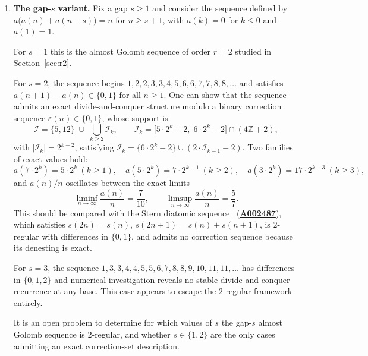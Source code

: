 \documentclass[12pt]{article}
\theoremstyle{definition}
\theoremstyle{remark}
\newcommand{\Z}{\mathbb{Z}}
\newcommand{\oeis}[1]{\href{https://oeis.org/#1}{\textbf{#1}}}
\begin{document}
\begin{enumerate}
  \item \textbf{The gap-$s$ variant.}
        Fix a gap $s\ge 1$ and consider the sequence defined by
        $a\bigl(a(n)+a(n-s)\bigr)=n$ for $n\ge s+1$, with $a(k)=0$ for $k\le 0$
        and $a(1)=1$.

        For $s=1$ this is the almost Golomb sequence of order $r=2$ studied in
        Section~\ref{sec:r2}.

        For $s=2$, the sequence begins
        $1,2,2,3,3,4,5,6,6,7,7,8,8,\ldots$
        and satisfies $a(n+1)-a(n)\in\{0,1\}$ for all $n\ge 1$.
        One can show that the sequence admits an exact divide-and-conquer
        structure modulo a binary correction sequence $\varepsilon(n)\in\{0,1\}$,
        whose support is
        \[
          \mathcal{I} = \{5,12\}\;\cup\;\bigcup_{k\ge 2}\mathcal{I}_k,
          \qquad
          \mathcal{I}_k = \bigl[5\cdot 2^k+2,\;6\cdot 2^k-2\bigr]\cap(4\Z+2),
        \]
        with $|\mathcal{I}_k|=2^{k-2}$, satisfying $\mathcal{I}_k=\{6\cdot 2^k-2\}\cup(2\cdot\mathcal{I}_{k-1}-2)$.
        Two families of exact values hold:
        \[
          a(7\cdot 2^k) = 5\cdot 2^k\ (k\ge 1),\quad
          a(5\cdot 2^k) = 7\cdot 2^{k-1}\ (k\ge 2),\quad
          a(3\cdot 2^k) = 17\cdot 2^{k-3}\ (k\ge 3),
        \]
        and $a(n)/n$ oscillates between the exact limits
        \[
          \liminf_{n\to\infty}\frac{a(n)}{n} = \frac{7}{10},\qquad
          \limsup_{n\to\infty}\frac{a(n)}{n} = \frac{5}{7}.
        \]
        This should be compared with the Stern diatomic sequence~\cite[Chap.\,16]{AS03}
        (\oeis{A002487}), which satisfies $s(2n)=s(n)$, $s(2n+1)=s(n)+s(n+1)$,
        is $2$-regular with differences in $\{0,1\}$, and admits no correction
        sequence because its denesting is exact.

        For $s=3$, the sequence $1,3,3,4,4,5,5,6,7,8,8,$\linebreak$9,10,11,11,\ldots$
        has differences in $\{0,1,2\}$ and numerical investigation reveals
        no stable divide-and-conquer recurrence at any base.
        This case appears to escape the $2$-regular framework entirely.

        It is an open problem to determine for which values of $s$ the
        gap-$s$ almost Golomb sequence is $2$-regular, and whether $s\in\{1,2\}$
        are the only cases admitting an exact correction-set description.
\end{enumerate}

\appendix
\end{document}
